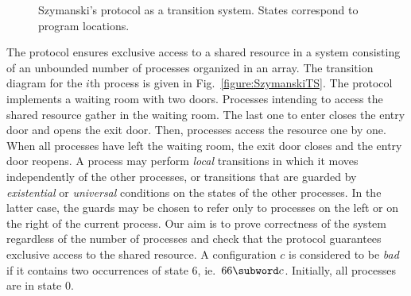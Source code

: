 \begin{wrapfigure}{r}[2pt]{0.6\textwidth}
  \caption{Szymanski's protocol as a transition system. States
    correspond to program locations.}
\end{wrapfigure}
%
The protocol ensures exclusive access to a shared resource in a system
consisting of an unbounded number of processes organized in an array.
%
The transition diagram for the $i$th process is given in
Fig.~\ref{figure:SzymanskiTS}.
%
The protocol implements a waiting room with two doors. %
Processes intending to access the shared resource gather in the
waiting room.
%
The last one to enter closes the entry door and opens the exit door.
%
Then, processes access the resource one by one.
%
%
When all processes have left the waiting room, the exit door closes
and the entry door reopens.
%
A process may perform {\it local} transitions in which
it moves independently of the other processes,
or transitions that are guarded by {\it existential} or 
{\it universal} conditions on the states of the other processes. 
%
In the latter case, the guards may be chosen to refer only to
processes on the left or on the right of the current process.
%
Our aim is to prove correctness of the system regardless of the number
of processes and check that the protocol guarantees exclusive access
to the shared resource. A configuration $c$ is considered to be
\emph{bad} if it contains two occurrences of state $6$, ie.\
$66\subword c$. Initially, all processes are in state $0$.
